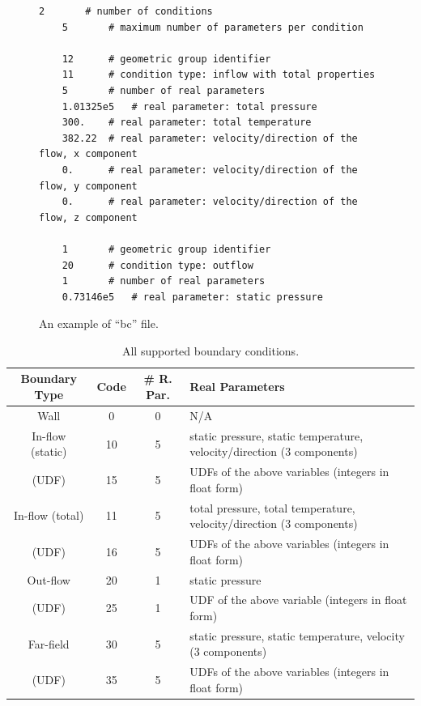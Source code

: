 \documentclass[]{article}
\begin{document}
\begin{figure}[h!]
  \begin{lstlisting}[backgroundcolor=\color{lightgray}]
    2		# number of conditions
    5		# maximum number of parameters per condition
    
    12		# geometric group identifier
    11		# condition type: inflow with total properties
    5		# number of real parameters
    1.01325e5	# real parameter: total pressure
    300.	# real parameter: total temperature
    382.22	# real parameter: velocity/direction of the flow, x component
    0.		# real parameter: velocity/direction of the flow, y component
    0.		# real parameter: velocity/direction of the flow, z component
    
    1		# geometric group identifier
    20		# condition type: outflow
    1		# number of real parameters
    0.73146e5	# real parameter: static pressure
  \end{lstlisting}
  \caption{An example of ``bc'' file.}
  \label{lst:bc}
\end{figure}

\begin{table}
\caption{All supported boundary conditions.}
  \begin{tabular}{cccl}
    \hline
    Boundary Type & Code & \# R. Par. & Real Parameters \\
    \hline
    Wall & 0 & 0 & N/A \\
    In-flow (static) & 10 & 5 &
      static pressure, static temperature, velocity/direction (3 components) \\
    (UDF) & 15 & 5 & UDFs of the above variables (integers in float form) \\
    In-flow (total) & 11 & 5 &
      total pressure, total temperature, velocity/direction (3 components) \\
    (UDF) & 16 & 5 & UDFs of the above variables (integers in float form) \\
    Out-flow & 20 & 1 & static pressure \\
    (UDF) & 25 & 1 & UDF of the above variable (integers in float form) \\
    Far-field & 30 & 5 &
      static pressure, static temperature, velocity (3 components) \\
    (UDF) & 35 & 5 & UDFs of the above variables (integers in float form) \\
    \hline
  \end{tabular}
  \label{tab:bc}
\end{table}
\end{document}
